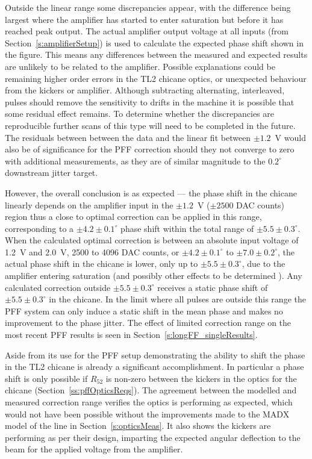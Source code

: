 Outside the linear range some discrepancies appear, with the difference being largest where the amplifier has started to enter saturation but before it has reached peak output. 
The actual amplifier output voltage at all inputs (from
 Section~\ref{s:amplifierSetup}) is used to calculate the expected phase shift shown in the figure. This means any differences between the measured and expected results are unlikely to be related to the amplifier.
Possible explanations could be remaining higher order errors in the TL2 chicane optics, or unexpected behaviour from the kickers or amplifier. Although subtracting alternating, interleaved, pulses should remove the sensitivity to drifts in the machine it is possible that some residual effect remains. To determine whether the discrepancies are reproducible further scans of this type will need to be completed in the future. The residuals between between the data and the linear fit between \(\pm1.2\)~V would also be of significance for the PFF correction should they not converge to zero with additional measurements, as they are of similar magnitude to the \(0.2^\circ\) downstream jitter target. 

However, the overall conclusion is as expected --- the phase shift in the chicane linearly depends on the amplifier input in the \(\pm1.2\)~V (\(\pm2500\) DAC counts) region thus a close to optimal correction can be applied in this range, corresponding to a \(\pm4.2\pm0.1^\circ\) phase shift within the total range of \(\pm5.5\pm0.3^\circ\). When the calculated optimal correction is between an absolute input voltage of 1.2~V and 2.0~V, 2500 to 4096 DAC counts, or \(\pm4.2\pm0.1^\circ\) to \(\pm7.0\pm0.2^\circ\), the actual phase shift in the chicane is lower, only up to \(\pm5.5\pm0.3^\circ\), due to the amplifier entering saturation (and possibly other effects to be determined ). Any calculated correction outside \(\pm5.5\pm0.3^\circ\) receives a static phase shift of \(\pm5.5\pm0.3^\circ\) in the chicane. In the limit where all pulses are outside this range the PFF system can only induce a static shift in the mean phase and makes no improvement to the phase jitter. The effect of limited correction range on the most recent PFF results is seen in Section~\ref{s:longFF_singleResults}.

Aside from its use for the PFF setup demonstrating the ability
 to shift the phase in the TL2 chicane is already a significant 
 accomplishment. In particular a phase shift is only possible if 
 \(R_{52}\) is non-zero between the kickers in the optics for the
 chicane (Section~\ref{ss:pffOpticsReqs}). The agreement between the
 modelled and measured correction range verifies the optics is 
 performing as expected, which would not have been possible without
 the improvements made to the MADX model of the line in
 Section~\ref{s:opticsMeas}. It also shows the kickers are performing
 as per their design, imparting the expected angular deflection to
 the beam for the applied voltage from the amplifier.

